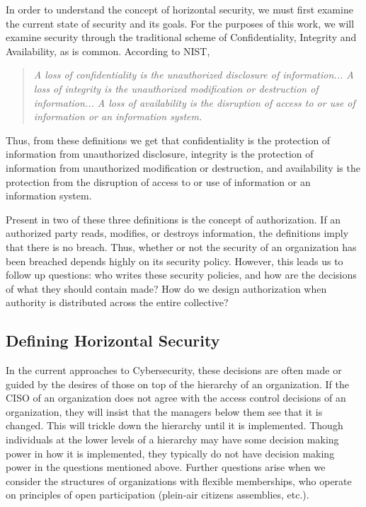 In order to understand the concept of horizontal security, we must first examine
the current state of security and its goals. For the purposes of this work, we
will examine security through the traditional scheme of Confidentiality,
Integrity and Availability, as is common. According to NIST,

\begin{quotation}
\textit{A loss of confidentiality is the unauthorized disclosure of 
information... A loss of integrity is the unauthorized modification or
destruction of information... A loss of availability is the disruption of access
to or use of information or an information system.}~\cite{pub2004standards}
\end{quotation}

Thus, from these definitions we get that confidentiality is the protection of 
information from unauthorized disclosure, integrity is the protection of
information from unauthorized modification or destruction, and availability is
the protection from the disruption of access to or use of information or an
information system.

Present in two of these three definitions is the concept of authorization. If an
authorized party reads, modifies, or destroys information, the definitions imply
that there is no breach. Thus, whether or not the security of an organization has
been breached depends highly on its security policy. However, this leads us to
follow up questions: who writes these security policies, and how are the
decisions of what they should contain made? How do we design authorization when
authority is distributed across the entire collective?

\subsection{Defining Horizontal Security}
\label{sec:definition}

In the current approaches to Cybersecurity, these decisions are often made or
guided by the desires of those on top of the hierarchy of an organization. If
the CISO of an organization does not agree with the access control decisions of
an organization, they will insist that the managers below them see that it is
changed. This will trickle down the hierarchy until it is implemented. Though
individuals at the lower levels of a hierarchy may have some decision making
power in how it is implemented, they typically do not have decision making power
in the questions mentioned above. Further questions arise when we consider the
structures of organizations with flexible memberships, who operate on principles
of open participation (plein-air citizens assemblies, etc.).

